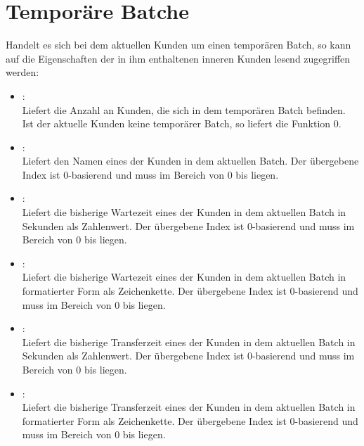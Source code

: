 \section{Temporäre Batche}

Handelt es sich bei dem aktuellen Kunden um einen temporären Batch, so kann auf die
Eigenschaften der in ihm enthaltenen inneren Kunden lesend zugegriffen werden:

\begin{itemize}
\item
{}:\\
Liefert die Anzahl an Kunden, die sich in dem temporären Batch befinden.
Ist der aktuelle Kunden keine temporärer Batch, so liefert die Funktion 0.

\item
{}:\\
Liefert den Namen eines der Kunden in dem aktuellen Batch.
Der übergebene Index ist 0-basierend und muss im Bereich von 0 bis  liegen.

\item
{}:\\
Liefert die bisherige Wartezeit eines der Kunden in dem aktuellen Batch in Sekunden als Zahlenwert.
Der übergebene Index ist 0-basierend und muss im Bereich von 0 bis  liegen.

\item
{}:\\
Liefert die bisherige Wartezeit eines der Kunden in dem aktuellen Batch in formatierter Form als Zeichenkette.
Der übergebene Index ist 0-basierend und muss im Bereich von 0 bis  liegen.

\item
{}:\\
Liefert die bisherige Transferzeit eines der Kunden in dem aktuellen Batch in Sekunden als Zahlenwert.
Der übergebene Index ist 0-basierend und muss im Bereich von 0 bis  liegen.

\item
{}:\\
Liefert die bisherige Transferzeit eines der Kunden in dem aktuellen Batch in formatierter Form als Zeichenkette.
Der übergebene Index ist 0-basierend und muss im Bereich von 0 bis  liegen.


\end{itemize}
